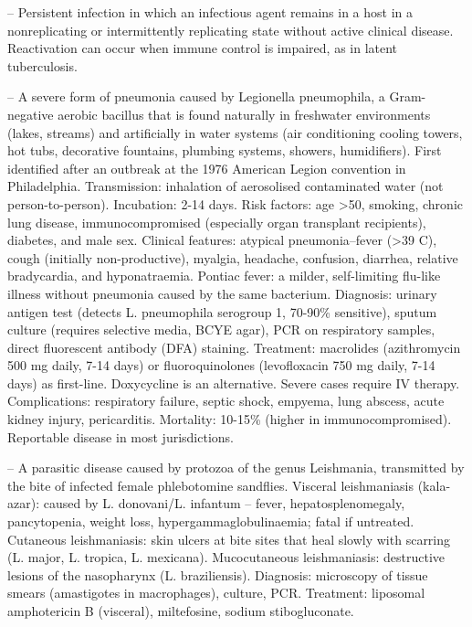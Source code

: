 -- Persistent infection in which an infectious agent remains in a host in a nonreplicating or intermittently replicating state without active clinical disease. Reactivation can occur when immune control is impaired, as in latent tuberculosis.

-- A severe form of pneumonia caused by Legionella pneumophila, a Gram-negative aerobic bacillus that is found naturally in freshwater environments (lakes, streams) and artificially in water systems (air conditioning cooling towers, hot tubs, decorative fountains, plumbing systems, showers, humidifiers). First identified after an outbreak at the 1976 American Legion convention in Philadelphia. Transmission: inhalation of aerosolised contaminated water (not person-to-person). Incubation: 2-14 days. Risk factors: age >50, smoking, chronic lung disease, immunocompromised (especially organ transplant recipients), diabetes, and male sex. Clinical features: atypical pneumonia--fever (>39 C), cough (initially non-productive), myalgia, headache, confusion, diarrhea, relative bradycardia, and hyponatraemia. Pontiac fever: a milder, self-limiting flu-like illness without pneumonia caused by the same bacterium. Diagnosis: urinary antigen test (detects L. pneumophila serogroup 1, 70-90\% sensitive), sputum culture (requires selective media, BCYE agar), PCR on respiratory samples, direct fluorescent antibody (DFA) staining. Treatment: macrolides (azithromycin 500 mg daily, 7-14 days) or fluoroquinolones (levofloxacin 750 mg daily, 7-14 days) as first-line. Doxycycline is an alternative. Severe cases require IV therapy. Complications: respiratory failure, septic shock, empyema, lung abscess, acute kidney injury, pericarditis. Mortality: 10-15\% (higher in immunocompromised). Reportable disease in most jurisdictions.

-- A parasitic disease caused by protozoa of the genus Leishmania, transmitted by the bite of infected female phlebotomine sandflies. Visceral leishmaniasis (kala-azar): caused by L. donovani/L. infantum -- fever, hepatosplenomegaly, pancytopenia, weight loss, hypergammaglobulinaemia; fatal if untreated. Cutaneous leishmaniasis: skin ulcers at bite sites that heal slowly with scarring (L. major, L. tropica, L. mexicana). Mucocutaneous leishmaniasis: destructive lesions of the nasopharynx (L. braziliensis). Diagnosis: microscopy of tissue smears (amastigotes in macrophages), culture, PCR. Treatment: liposomal amphotericin B (visceral), miltefosine, sodium stibogluconate.

